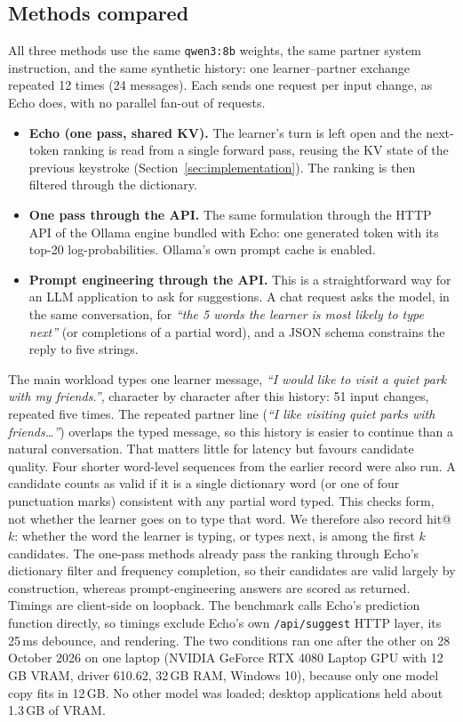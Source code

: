 \documentclass[11pt,a4paper]{article}
\newcommand{\code}[1]{\texttt{#1}}
\begin{document}
\subsection{Methods compared}
All three methods use the same \code{qwen3:8b} weights, the same partner system instruction, and the same synthetic history: one learner--partner exchange repeated 12 times (24 messages). Each sends one request per input change, as Echo does, with no parallel fan-out of requests.
\begin{itemize}\setlength{\itemsep}{1pt}
\item \textbf{Echo (one pass, shared KV).} The learner's turn is left open and the next-token ranking is read from a single forward pass, reusing the KV state of the previous keystroke (Section~\ref{sec:implementation}). The ranking is then filtered through the dictionary.
\item \textbf{One pass through the API.} The same formulation through the HTTP API of the Ollama engine bundled with Echo: one generated token with its top-20 log-probabilities. Ollama's own prompt cache is enabled.
\item \textbf{Prompt engineering through the API.} This is a straightforward way for an LLM application to ask for suggestions. A chat request asks the model, in the same conversation, for \emph{``the 5 words the learner is most likely to type next''} (or completions of a partial word), and a JSON schema constrains the reply to five strings.
\end{itemize}
The main workload types one learner message, \emph{``I would like to visit a quiet park with my friends.''}, character by character after this history: 51 input changes, repeated five times. The repeated partner line (\emph{``I like visiting quiet parks with friends\ldots''}) overlaps the typed message, so this history is easier to continue than a natural conversation. That matters little for latency but favours candidate quality. Four shorter word-level sequences from the earlier record were also run. A candidate counts as valid if it is a single dictionary word (or one of four punctuation marks) consistent with any partial word typed. This checks form, not whether the learner goes on to type that word. We therefore also record hit@$k$: whether the word the learner is typing, or types next, is among the first $k$ candidates. The one-pass methods already pass the ranking through Echo's dictionary filter and frequency completion, so their candidates are valid largely by construction, whereas prompt-engineering answers are scored as returned. Timings are client-side on loopback. The benchmark calls Echo's prediction function directly, so timings exclude Echo's own \code{/api/suggest} HTTP layer, its 25\,ms debounce, and rendering. The two conditions ran one after the other on 28 October 2026 on one laptop (NVIDIA GeForce RTX 4080 Laptop GPU with 12\,GB VRAM, driver 610.62, 32\,GB RAM, Windows 10), because only one model copy fits in 12\,GB. No other model was loaded; desktop applications held about 1.3\,GB of VRAM.
\end{document}
